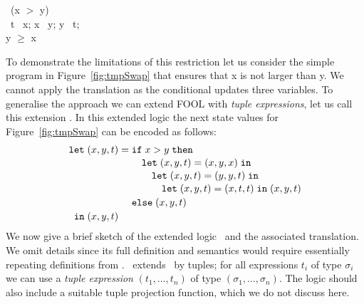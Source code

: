 \begin{figure*}[tb]
  \vspace{-1em}
  \begin{center}
    \parbox{0cm}{
      \begin{tabbing}
        \IF\ (x $>$ y) \\\inc
        \THEN\ t \ass\ x; x \ass\ y; y \ass\ t;\\\dec
         y $\geq$ x
      \end{tabbing}
    }
  \end{center}
  \vspace*{-2em}
  \caption{Updating multiple variables.\label{fig:tmpSwap}}
\end{figure*}

To demonstrate the limitations of this restriction let us consider the simple program in Figure~\ref{fig:tmpSwap} that ensures that x is not larger than y. We cannot apply the translation as the conditional updates three variables. To generalise the approach we can extend FOOL with \emph{tuple expressions}, let us call this extension \foolp. In this extended logic the next state values for Figure~\ref{fig:tmpSwap} can be encoded as follows:
%
\[
  \letnl{(x,y,t)}{\itenll{x > y}
                 {\letinnl{(x,y,t)}{(x,y,x)}
                          {\letinnl{(x,y,t)}{(y,y,t)}
                                   {\letin{(x,y,t)}{(x,t,t)}
                                            {(x,y,t)}}}}
                 {(x,y,t)}}
        {(x,y,t)}
\]
%
We now give a brief sketch of the extended logic \foolp\ and the associated translation. We omit details since its full definition and semantics would require essentially repeating definitions from \cite{FOOL}.  \foolp\ extends \fool\ by tuples; for all expressions $t_i$ of type $\sigma_i$ we can use a \emph{tuple expression} $(t_1,\ldots,t_n)$ of type $(\sigma_1,\ldots,\sigma_n)$. The logic should also include a suitable tuple projection function, which we do not discuss here.

